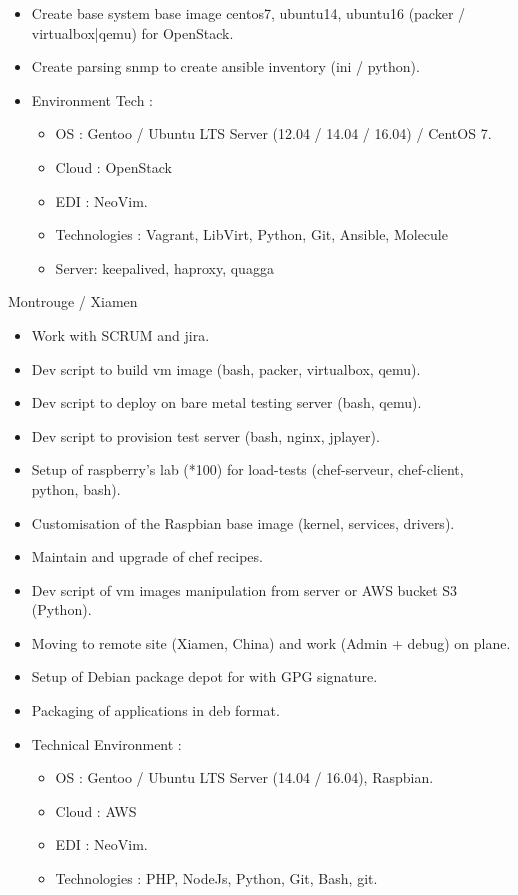 \documentclass[10pt,a4paper,sans]{moderncv}
\begin{document}
{\begin{itemize}
    \item Create base system base image centos7, ubuntu14, ubuntu16 (packer / virtualbox|qemu) for OpenStack.
    \item Create parsing snmp to create ansible inventory (ini / python).
    \item Environment Tech :
      \begin{itemize}%
        \item OS : Gentoo / Ubuntu LTS Server (12.04 / 14.04 / 16.04) / CentOS 7.
        \item Cloud : OpenStack
        \item EDI : NeoVim.
        \item Technologies : Vagrant, LibVirt, Python, Git, Ansible, Molecule
        \item Server: keepalived, haproxy, quagga
      \end{itemize}
  \end{itemize}}

\vskip 2cm

{Montrouge / Xiamen}{
  \begin{itemize}%
    \item Work with SCRUM and jira.
    \item Dev script to build vm image (bash, packer, virtualbox, qemu).
    \item Dev script to deploy on bare metal testing server (bash, qemu).
    \item Dev script to provision test server (bash, nginx, jplayer).
    \item Setup of raspberry's lab (*100) for load-tests (chef-serveur, chef-client, python, bash).
    \item Customisation of the Raspbian base image (kernel, services, drivers).
    \item Maintain and upgrade of chef recipes.
    \item Dev script of vm images manipulation from server or AWS bucket S3 (Python).
    \item Moving to remote site (Xiamen, China) and work (Admin + debug) on plane.
    \item Setup of Debian package depot for with GPG signature.
    \item Packaging of applications in deb format.
    \item Technical Environment :
      \begin{itemize}%
        \item OS : Gentoo / Ubuntu LTS Server (14.04 / 16.04), Raspbian.
        \item Cloud : AWS
        \item EDI : NeoVim.
        \item Technologies : PHP, NodeJs, Python, Git, Bash, git.
      \end{itemize}
  \end{itemize}}
\end{document}
